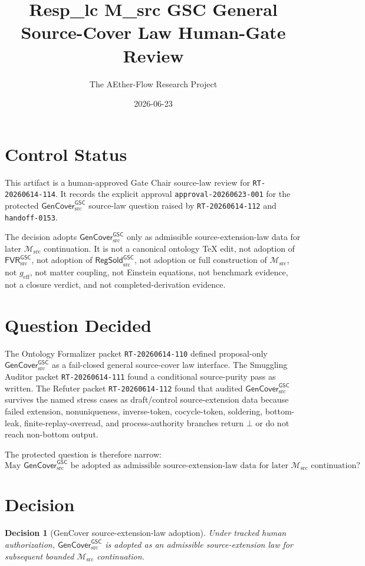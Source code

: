 \documentclass[11pt]{article}
\title{Resp\_lc M\_src GSC General Source-Cover Law Human-Gate Review}
\author{The AEther-Flow Research Project}
\date{2026-06-23}
\newcommand{\Msrc}{\mathcal{M}_{\mathrm{src}}}
\newcommand{\geff}{g_{\mathrm{eff}}}
\newcommand{\GenCover}{\mathsf{GenCover}_{\mathrm{src}}^{\mathsf{GSC}}}
\newcommand{\FVR}{\mathsf{FVR}_{\mathrm{src}}^{\mathsf{GSC}}}
\newcommand{\RegSold}{\mathsf{RegSold}_{\mathrm{src}}^{\mathsf{GSC}}}
\newcommand{\Bot}{\bot}
\newtheorem{decision}{Decision}
\begin{document}
\maketitle

\section*{Control Status}

This artifact is a human-approved Gate Chair source-law review for
\texttt{RT-20260614-114}. It records the explicit approval
\texttt{approval-20260623-001} for the protected \(\GenCover\) source-law
question raised by \texttt{RT-20260614-112} and \texttt{handoff-0153}.

The decision adopts \(\GenCover\) only as admissible source-extension-law
data for later \(\Msrc\) continuation. It is not a canonical ontology TeX
edit, not adoption of \(\FVR\), not adoption of \(\RegSold\), not adoption or
full construction of \(\Msrc\), not \(\geff\), not matter coupling, not
Einstein equations, not benchmark evidence, not a closure verdict, and not
completed-derivation evidence.

\section{Question Decided}

The Ontology Formalizer packet \texttt{RT-20260614-110} defined
proposal-only \(\GenCover\) as a fail-closed general source-cover law
interface. The Smuggling Auditor packet \texttt{RT-20260614-111} found a
conditional source-purity pass as written. The Refuter packet
\texttt{RT-20260614-112} found that audited \(\GenCover\) survives the named
stress cases as draft/control source-extension data because failed extension,
nonuniqueness, inverse-token, cocycle-token, soldering, bottom-leak,
finite-replay-overread, and process-authority branches return \(\Bot\) or do
not reach non-bottom output.

The protected question is therefore narrow:
\[
\text{May }\GenCover\text{ be adopted as admissible source-extension-law data}
\text{ for later }\Msrc\text{ continuation?}
\]

\section{Decision}

\begin{decision}[GenCover source-extension-law adoption]
Under tracked human authorization, \(\GenCover\) is adopted as an admissible
source-extension law for subsequent bounded \(\Msrc\) continuation.
\end{decision}
\end{document}
